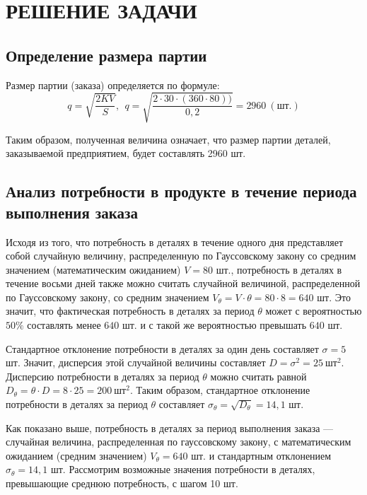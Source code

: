 \section{РЕШЕНИЕ ЗАДАЧИ}

\subsection{Определение размера партии}

Размер партии (заказа) определяется по формуле:
\begin{equation}
	q = \sqrt{\dfrac{2KV}{S}}, ~~ q = \sqrt{\dfrac{2 \cdot 30 \cdot (360 \cdot 80))}{0,2}} = 2960 \: (\text{шт.})
\end{equation}

Таким образом, полученная величина означает, что размер партии деталей,
заказываемой предприятием, будет составлять 2960 шт.


\subsection{Анализ потребности в продукте в течение периода \\ выполнения заказа}

Исходя из того, что потребность в деталях в течение одного дня представляет
собой случайную величину, распределенную по Гауссовскому закону со средним значением
(математическим ожиданием) $V=80$ шт., потребность в деталях в течение восьми дней
также можно считать случайной величиной, распределенной по Гауссовскому закону,
со средним значением $V_\theta = V \cdot \theta = 80 \cdot 8 = 640 $ шт.
Это значит, что фактическая потребность в деталях за период $\theta$ может
с вероятностью $50\%$ составлять менее $640$ шт. и с такой же вероятностью превышать $640$ шт.

Стандартное отклонение потребности в деталях за один день составляет $\sigma=5$ шт.
Значит, дисперсия этой случайной величины составляет $D = \sigma^2 = 25 \: \text{шт}^2 $.
Дисперсию потребности в деталях за период $\theta$ можно считать равной
$D_\theta = \theta \cdot D = 8 \cdot 25 = 200 \: \text{шт}^2$. Таким образом,
стандартное отклонение потребности в деталях за период $\theta$ составляет
$\sigma_{\theta} = \sqrt{D_\theta} = 14{,}1 $ шт.

Как показано выше, потребность в деталях за период выполнения заказа ---
случайная величина, распределенная по гауссовскому закону, с математическим
ожиданием (средним значением)  $V_\theta = 640 $ шт. и стандартным отклонением $\sigma_{\theta} = 14{,}1 $ шт.
Рассмотрим возможные значения потребности в деталях, превышающие среднюю потребность, с шагом 10 шт.

